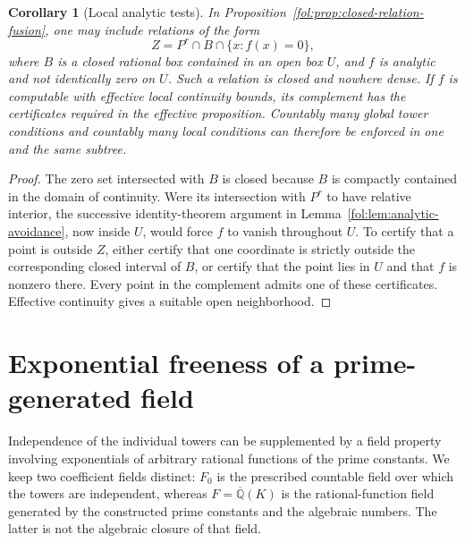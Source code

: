 \documentclass[11pt,a4paper]{article}
\newtheorem{corollary}[theorem]{Corollary}
\theoremstyle{definition}
\theoremstyle{remark}
\numberwithin{equation}{section}
\begin{document}
\begin{corollary}[Local analytic tests]\label{fol:cor:local-analytic-tests}
In Proposition~\ref{fol:prop:closed-relation-fusion}, one may include
relations of the form
\[
 Z=P^r\cap B\cap\{x:f(x)=0\},
\]
where $B$ is a closed rational box contained in an open box $U$, and
$f$ is analytic and not identically zero on $U$. Such a relation is
closed and nowhere dense. If $f$ is computable with effective local
continuity bounds, its complement has the certificates required in the
effective proposition. Countably many global tower conditions and
countably many local conditions can therefore be enforced in one and
the same subtree.
\end{corollary}
\begin{proof}
The zero set intersected with $B$ is closed because $B$ is compactly
contained in the domain of continuity. Were its intersection with
$P^r$ to have relative interior, the successive identity-theorem
argument in Lemma~\ref{fol:lem:analytic-avoidance}, now inside $U$, would
force $f$ to vanish throughout $U$. To certify that a point is outside
$Z$, either certify that one coordinate is strictly outside the
corresponding closed interval of $B$, or certify that the point lies in
$U$ and that $f$ is nonzero there. Every point in the complement admits
one of these certificates. Effective continuity gives a suitable open
neighborhood.
\end{proof}


\section{Exponential freeness of a prime-generated field}
\label{fol:sec:relative-exponential-field}

Independence of the individual towers can be supplemented by a field
property involving exponentials of arbitrary rational functions of the
prime constants.  We keep two coefficient fields distinct: $F_0$ is the
prescribed countable field over which the towers are independent, whereas
$F=\overline{\mathbb Q}(K)$ is the rational-function field generated by
the constructed prime constants and the algebraic numbers.
The latter is not the algebraic closure of that field.
\end{document}
